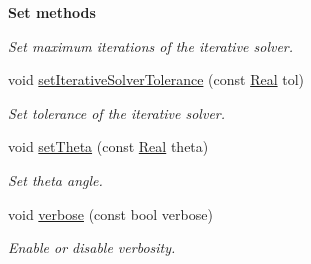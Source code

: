 \begin{Indent}{\bf Set methods}
\begin{DoxyCompactItemize}
\begin{DoxyCompactList}\small\item\em Set maximum iterations of the iterative solver. \end{DoxyCompactList}\item 
void \hyperlink{classFVCode3D_1_1Data_a805e2438f64b5effdbfd2d06058f5a0c}{set\+Iterative\+Solver\+Tolerance} (const \hyperlink{namespaceFVCode3D_a40c1f5588a248569d80aa5f867080e83}{Real} tol)
\begin{DoxyCompactList}\small\item\em Set tolerance of the iterative solver. \end{DoxyCompactList}\item 
void \hyperlink{classFVCode3D_1_1Data_a456bd98d3d97e0be1807861db3e6e48d}{set\+Theta} (const \hyperlink{namespaceFVCode3D_a40c1f5588a248569d80aa5f867080e83}{Real} theta)
\begin{DoxyCompactList}\small\item\em Set theta angle. \end{DoxyCompactList}\item 
void \hyperlink{classFVCode3D_1_1Data_a3bbbfecd1d18c9c81c151f65c2647020}{verbose} (const bool verbose)
\begin{DoxyCompactList}\small\item\em Enable or disable verbosity. \end{DoxyCompactList}\end{DoxyCompactItemize}
\end{Indent}
